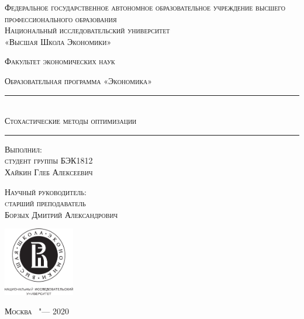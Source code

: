 \thispagestyle{empty}
\begin{center}
	{\textsc{ Федеральное государственное автономное образовательное учреждение высшего профессионального образования \\ Национальный исследовательский университет \\ «Высшая Школа Экономики»}}
\end{center}

%
\vspace{0pt plus2fill} %
\begin{center}
	{{\large \textsc{Факультет экономических наук}}}
\end{center}
%

%
\vspace{-20pt} %
\begin{center}
	{{\large \textsc{Образовательная программа «Экономика»}}}
\end{center}
%




\rule{16.5cm}{1.5pt}

\begin{center}
	{\Large{} \\
		\vspace{10pt}
		\large{\textsc{Стохастические методы оптимизации}}}
\end{center}

\rule{16.5cm}{1.5pt}

%
\vspace{0pt plus4fill} %
\begin{flushright}
	\textsc{Выполнил: \\ студент группы БЭК1812 \\ Хайкин Глеб Алексеевич}
\end{flushright}

%
\vspace{0pt plus2fill} %
\begin{flushright}
\textsc{Научный руководитель: \\ cтарший преподаватель \\ Борзых Дмитрий Александрович}
\end{flushright}

%
\vspace{100pt}
	\begin{center}
		\includegraphics[height=3cm]{images/logobcopy}
	\end{center}


%
\vspace{0pt plus4fill} %
{\centering \textsc{Москва \ "--- 2020}\par}

